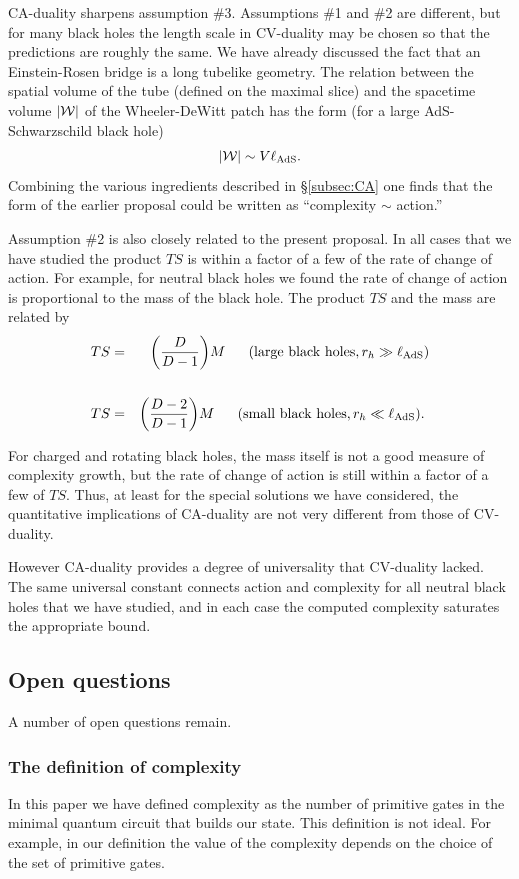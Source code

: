 \documentclass[12pt]{article}
\numberwithin{equation}{section}
\newcommand{\be}{\begin{equation}}
\newcommand{\ee}{\end{equation}}
\def\bea{\begin{eqnarray}}
\def\eea{\end{eqnarray}}
\def\CW{{\cal W}}
\newcommand{\lads}{\ell_{\text{AdS}}}
\begin{document}
CA-duality sharpens assumption \#3. Assumptions \#1 and \#2 are different, but for many black holes the  length scale in CV-duality may be chosen so that the predictions are roughly the same.  We have already discussed the fact that an Einstein-Rosen bridge is a long tubelike geometry. The relation between the spatial volume of the tube (defined on the maximal slice) and the spacetime volume $|\CW|$ of the Wheeler-DeWitt patch has the form (for a large AdS-Schwarzschild black hole)
\be
|\CW|  \sim V \lads.
\ee
Combining the various ingredients described in \S\ref{subsec:CA} one finds that the form of the earlier proposal could be written as ``complexity $\sim$ action.''

Assumption \#2 is also closely related to the present proposal. In all cases that we have studied the product $TS$ is within a factor of a few of the rate of change of action. For example, for neutral black holes we found the rate of change of action is proportional to the mass of the black hole. The product $TS$ and the mass are related by
\bea
TS &=& \bigg( \frac{D}{D-1} \bigg)M  \ \ \ \ \ \textrm{(large black holes}, r_h \gg \lads)    \cr \cr
TS &=& \bigg( \frac{D-2}{D-1} \bigg)M  \ \ \ \ \  \textrm{(small black holes}, r_h \ll \lads) .\
\eea

For charged and rotating  black holes, the mass itself is not a good measure of complexity growth, but the rate of change of action is still within a factor of a few of $TS.$
Thus, at least for the special solutions we have considered, the quantitative implications of CA-duality are not very different from those of CV-duality.

However CA-duality  provides a degree of universality that CV-duality lacked. The same universal constant connects action and complexity for all neutral black holes that we have studied, and in each case the computed complexity saturates the appropriate bound.



\subsection{Open questions}

A number of open questions remain.
\subsubsection{The definition of complexity}

In this paper we have defined complexity as the number of primitive gates in the minimal quantum circuit that builds our state. This definition is not ideal. For example, in our definition the value of the complexity depends on the choice of  the set of primitive gates.
\end{document}

